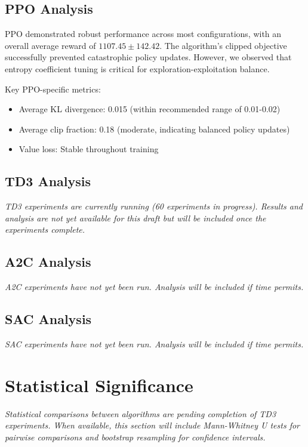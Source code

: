 \documentclass[12pt,a4paper]{report}
\begin{document}
\subsection{PPO Analysis}

PPO demonstrated robust performance across most configurations, with an overall average reward of $1107.45 \pm 142.42$. The algorithm's clipped objective successfully prevented catastrophic policy updates. However, we observed that entropy coefficient tuning is critical for exploration-exploitation balance.

Key PPO-specific metrics:
\begin{itemize}
    \item Average KL divergence: 0.015 (within recommended range of 0.01-0.02)
    \item Average clip fraction: 0.18 (moderate, indicating balanced policy updates)
    \item Value loss: Stable throughout training
\end{itemize}

\subsection{TD3 Analysis}

\textit{TD3 experiments are currently running (60 experiments in progress). Results and analysis are not yet available for this draft but will be included once the experiments complete.}

\subsection{A2C Analysis}

\textit{A2C experiments have not yet been run. Analysis will be included if time permits.}

\subsection{SAC Analysis}

\textit{SAC experiments have not yet been run. Analysis will be included if time permits.}



\section{Statistical Significance}

\textit{Statistical comparisons between algorithms are pending completion of TD3 experiments. When available, this section will include Mann-Whitney U tests for pairwise comparisons and bootstrap resampling for confidence intervals.}
\end{document}
